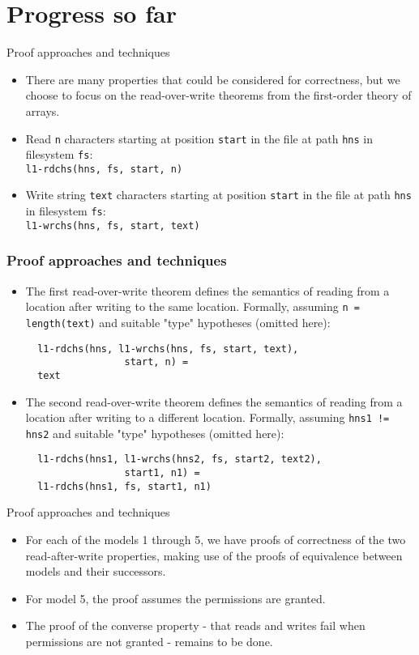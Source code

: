 \documentclass{beamer}
\begin{document}
\section{Progress so far}
\begin{frame}{Proof approaches and techniques}
  \begin{itemize}
  \item There are many properties that could be considered for
    correctness, but we choose to focus on the read-over-write
    theorems from the first-order theory of arrays.
  \item Read \texttt{n} characters starting at position \texttt{start}
    in the file at path \texttt{hns} in filesystem \texttt{fs}: \\
    \texttt{l1-rdchs(hns, fs, start, n)}
  \item Write string \texttt{text} characters starting at position \texttt{start}
    in the file at path \texttt{hns} in filesystem \texttt{fs}: \\
    \texttt{l1-wrchs(hns, fs, start, text)}
  \end{itemize}
\end{frame}
\begin{frame}[fragile]
  \frametitle{Proof approaches and techniques}
  \begin{itemize}
  \item The first read-over-write theorem defines the semantics of
    reading from a location after writing to the same
    location. Formally, assuming \texttt{n =
      length(text)} and suitable "type" hypotheses (omitted here): \\
\begin{verbatim}
  l1-rdchs(hns, l1-wrchs(hns, fs, start, text),
                 start, n) =
  text
\end{verbatim}
  \item The second read-over-write theorem defines the semantics of
    reading from a location after writing to a different
    location. Formally, assuming \texttt{hns1 != hns2} and suitable "type"
    hypotheses (omitted here):\\
\begin{verbatim}
  l1-rdchs(hns1, l1-wrchs(hns2, fs, start2, text2),
                 start1, n1) =
  l1-rdchs(hns1, fs, start1, n1)
\end{verbatim}
  \end{itemize}
\end{frame}

\begin{frame}{Proof approaches and techniques}
  \begin{itemize}
  \item For each of the models 1 through 5, we have proofs of correctness of
    the two read-after-write properties, making use of the proofs of
    equivalence between models and their successors.
  \item For model 5, the proof assumes the permissions are
    granted.
  \item The proof of the converse property - that reads and writes
    fail when permissions are not granted - remains to be done.
  \end{itemize}
\end{frame}
\end{document}
